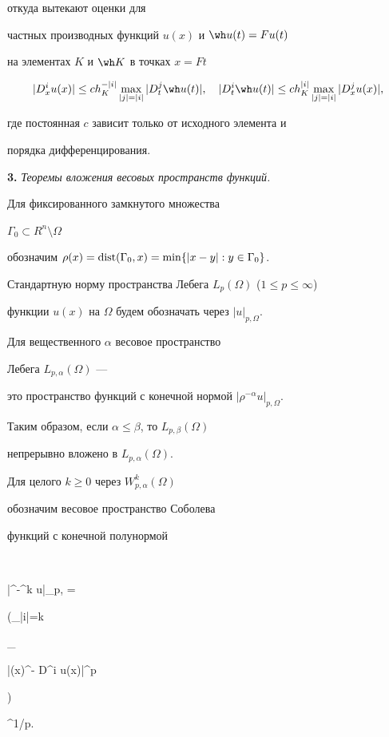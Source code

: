 откуда вытекают оценки для 


частных производных функций $u(x)$ и $\wh u (t)=Fu(t)$ 


на элементах $K$ и $\wh K$ в точках $x=Ft$


\begin{equation} \label{est:diff}


|D^i_xu(x)| \le c h^{-|i|}_K \max \limits_{|j|=|i|} |D^j_t \wh u (t)|, \quad 


|D^i_t \wh u(t)| \le c h^{|i|}_K \max \limits_{|j|=|i|} |D^j_x u (x)|,


\end{equation}


где постоянная $c$ зависит только от исходного элемента и 


порядка дифференцирования.


\medskip





{\bf 3.} {\it Теоремы вложения весовых пространств функций.} 


Для фиксированного замкнутого множества 


$\Gamma_0 \subset R^n \setminus \Omega$ 


обозначим $\rho(x)=\operatorname{dist} (\Gamma_0,x)=\min\{|x-y|: y \in \Gamma_0\}$. 


Стандартную норму пространства Лебега $L_p(\Omega)$ ($1\le p \le \infty$) 


функции $u(x)$ на $\Omega$ будем обозначать через ${|u|}_{p,\Omega}$. 


Для вещественного $\alpha$ весовое пространство 


Лебега $L_{p,\alpha}(\Omega)$ ---


это пространство функций с конечной нормой ${|\rho^{-\alpha} u|}_{p,\Omega}$. 


Таким образом, если $\alpha \le \beta$, то $L_{p,\beta}(\Omega)$ 


непрерывно вложено в $L_{p,\alpha}(\Omega)$.


Для целого $k \ge 0$ через $W^k_{p,\alpha}(\Omega)$ 


обозначим весовое пространство Соболева 


функций с конечной полунормой 


$$


{|\rho^{-\alpha}\nabla ^k u|}_{p,\Omega} = 


{\bigg(\sum _{|i|=k} {\int _{\Omega}


{|\rho(x)^{-\alpha} D^i u(x)|}^p } \bigg)}^{1/p}. 


